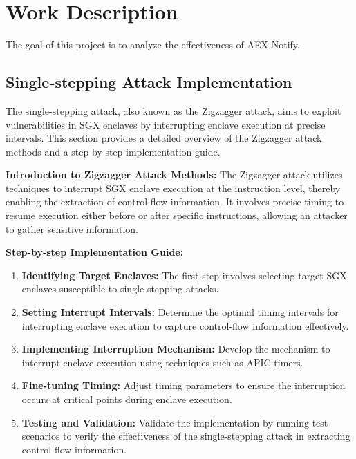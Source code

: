 \documentclass{llncs}
\begin{document}

\section{Work Description}

The goal of this project is to analyze the effectiveness of AEX-Notify.

\subsection{Single-stepping Attack Implementation}

The single-stepping attack, also known as the Zigzagger attack,
aims to exploit vulnerabilities in SGX enclaves
by interrupting enclave execution at precise intervals.
This section provides a detailed overview of the Zigzagger attack methods and a step-by-step implementation guide.

\textbf{Introduction to Zigzagger Attack Methods:}
The Zigzagger attack utilizes techniques to interrupt SGX enclave execution at the instruction level,
thereby enabling the extraction of control-flow information.
It involves precise timing to resume execution either before or after specific instructions,
allowing an attacker to gather sensitive information.

\textbf{Step-by-step Implementation Guide:}
\begin{enumerate}
  \item \textbf{Identifying Target Enclaves:} The first step involves selecting target SGX enclaves susceptible to single-stepping attacks.
  \item \textbf{Setting Interrupt Intervals:} Determine the optimal timing intervals for interrupting enclave execution to capture control-flow information effectively.
  \item \textbf{Implementing Interruption Mechanism:} Develop the mechanism to interrupt enclave execution using techniques such as APIC timers.
  \item \textbf{Fine-tuning Timing:} Adjust timing parameters to ensure the interruption occurs at critical points during enclave execution.
  \item \textbf{Testing and Validation:} Validate the implementation by running test scenarios to verify the effectiveness of the single-stepping attack in extracting control-flow information.
\end{enumerate}
\end{document}
